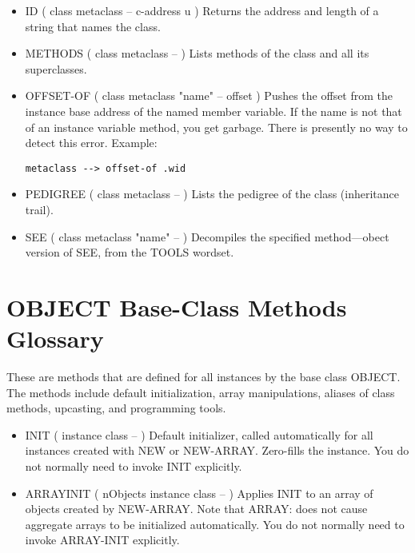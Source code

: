 \begin{;stlisting}[frame=single]
\begin{itemize}[noitemsep]
	\item ID ( class metaclass -- c-address u )\newline
	Returns the address and length of a string that names the class.

	\item METHODS ( class metaclass -- )\newline
	Lists methods of the class and all its superclasses.

	\item OFFSET-OF ( class metaclass "name" -- offset )\newline
	Pushes the offset from the instance base address of the named
	member variable. If the name is not that of an instance variable
	method, you get garbage. There is presently no way to detect
	this error. Example:
\begin{lstlisting}[frame=single]
metaclass --> offset-of .wid
\end{lstlisting}

	\item PEDIGREE ( class metaclass -- )\newline
	Lists the pedigree of the class (inheritance trail).

	\item SEE ( class metaclass "name" -- )\newline
	Decompiles the specified method—obect version of SEE, from the
	TOOLS wordset.
\end{itemize}


\section{OBJECT Base-Class Methods Glossary}
These are methods that are defined for all instances by the base class
OBJECT. The methods include default initialization, array manipulations,
aliases of class methods, upcasting, and programming tools.
\begin{itemize}[noitemsep]
	\item INIT ( instance class -- )\newline
	Default initializer, called automatically for all instances
	created with NEW or NEW-ARRAY. Zero-fills the instance. You do
	not normally need to invoke INIT explicitly.

	\item ARRAYINIT ( nObjects instance class -- )\newline
	Applies INIT to an array of objects created by NEW-ARRAY. Note
	that ARRAY: does not cause aggregate arrays to be initialized
	automatically. You do not normally need to invoke ARRAY-INIT
	explicitly.


\end{itemize}
\end{;stlisting}
